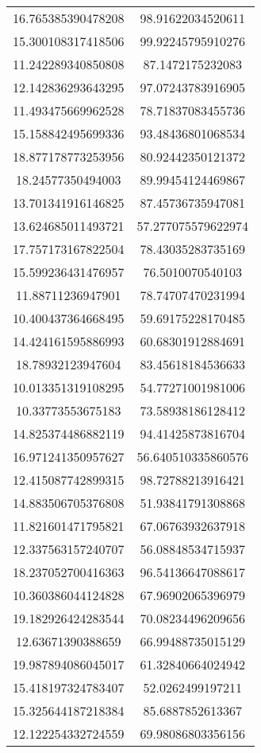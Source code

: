 \begin{table}
\begin{tabular}{cc}
16.765385390478208 & 98.91622034520611 \\
15.300108317418506 & 99.92245795910276 \\
11.242289340850808 & 87.1472175232083 \\
12.142836293643295 & 97.07243783916905 \\
11.493475669962528 & 78.71837083455736 \\
15.158842495699336 & 93.48436801068534 \\
18.877178773253956 & 80.92442350121372 \\
18.24577350494003 & 89.99454124469867 \\
13.701341916146825 & 87.45736735947081 \\
13.624685011493721 & 57.277075579622974 \\
17.757173167822504 & 78.43035283735169 \\
15.599236431476957 & 76.5010070540103 \\
11.88711236947901 & 78.74707470231994 \\
10.400437364668495 & 59.69175228170485 \\
14.424161595886993 & 60.68301912884691 \\
18.78932123947604 & 83.45618184536633 \\
10.013351319108295 & 54.77271001981006 \\
10.33773553675183 & 73.58938186128412 \\
14.825374486882119 & 94.41425873816704 \\
16.971241350957627 & 56.640510335860576 \\
12.415087742899315 & 98.72788213916421 \\
14.883506705376808 & 51.93841791308868 \\
11.821601471795821 & 67.06763932637918 \\
12.337563157240707 & 56.08848534715937 \\
18.237052700416363 & 96.54136647088617 \\
10.360386044124828 & 67.96902065396979 \\
19.182926424283544 & 70.08234496209656 \\
12.63671390388659 & 66.99488735015129 \\
19.987894086045017 & 61.32840664024942 \\
15.418197324783407 & 52.0262499197211 \\
15.325644187218384 & 85.6887852613367 \\
12.122254332724559 & 69.98086803356156 \\

\end{tabular}
\end{table}
